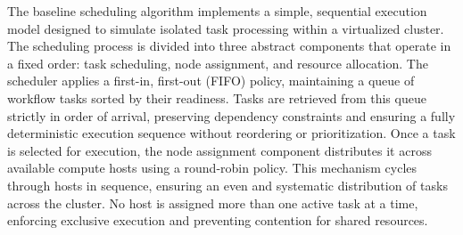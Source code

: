 The baseline scheduling algorithm implements a simple, sequential execution model designed to simulate isolated task processing within a virtualized cluster. The scheduling process is divided into three abstract components that operate in a fixed order: task scheduling, node assignment, and resource allocation. The scheduler applies a first-in, first-out (FIFO) policy, maintaining a queue of workflow tasks sorted by their readiness. Tasks are retrieved from this queue strictly in order of arrival, preserving dependency constraints and ensuring a fully deterministic execution sequence without reordering or prioritization.
Once a task is selected for execution, the node assignment component distributes it across available compute hosts using a round-robin policy. This mechanism cycles through hosts in sequence, ensuring an even and systematic distribution of tasks across the cluster. No host is assigned more than one active task at a time, enforcing exclusive execution and preventing contention for shared resources.

